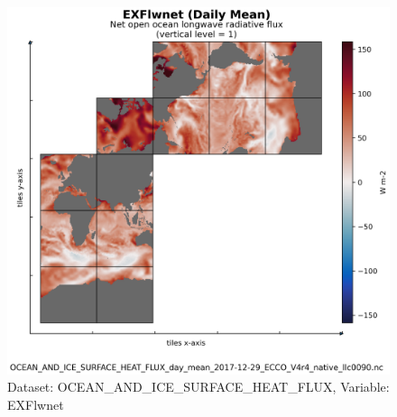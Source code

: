 \begin{figure}[H]
\centering
\includegraphics[scale=0.55]{../images/plots/native_plots/Ocean_and_Sea-Ice_Surface_Heat_Fluxes/EXFlwnet.png}
\caption{Dataset: OCEAN\_AND\_ICE\_SURFACE\_HEAT\_FLUX, Variable: EXFlwnet}
\label{tab:table-OCEAN_AND_ICE_SURFACE_HEAT_FLUX_EXFlwnet-Plot}
\end{figure}
\newpage
\pagebreak
